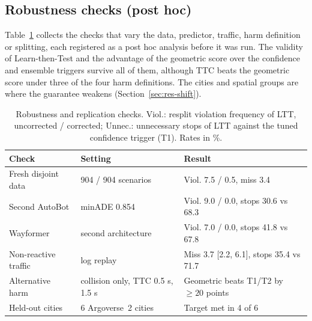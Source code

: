 \documentclass[lettersize,journal]{IEEEtran}
\begin{document}
\subsection{Robustness checks (post hoc)}
\label{sec:res-robust}
Table~\ref{tab:robust} collects the checks that vary the data, predictor,
traffic, harm definition or splitting, each registered as a post hoc analysis
before it was run. The validity of Learn-then-Test and the advantage of the geometric score over the confidence and ensemble triggers survive all of them, although TTC beats the geometric score under three of the four harm definitions. The cities and spatial groups are where the guarantee weakens (Section~\ref{sec:res-shift}).

\begin{table}[t]
\caption{Robustness and replication checks. Viol.: resplit violation
frequency of LTT, uncorrected / corrected; Unnec.: unnecessary stops of LTT
against the tuned confidence trigger (T1). Rates in \%.}
\label{tab:robust}
\centering
\scriptsize\setlength{\tabcolsep}{2.5pt}
\begin{tabular}{p{2.5cm}p{2.3cm}p{2.7cm}}
\toprule
Check & Setting & Result \\
\midrule
Fresh disjoint data & 904 / 904 scenarios & Viol. 7.5 / 0.5, miss 3.4 \\
Second AutoBot & minADE 0.854 & Viol. 9.0 / 0.0, stops 30.6 vs 68.3 \\
Wayformer & second architecture & Viol. 7.0 / 0.0, stops 41.8 vs 67.8 \\
Non-reactive traffic & log replay & Miss 3.7 [2.2, 6.1], stops 35.4 vs 71.7 \\
Alternative harm & collision only, TTC 0.5 s, 1.5 s & Geometric beats T1/T2 by $\ge 20$ points \\
Held-out cities & 6 Argoverse~2 cities & Target met in 4 of 6 \\
\bottomrule
\end{tabular}
\end{table}
\end{document}
